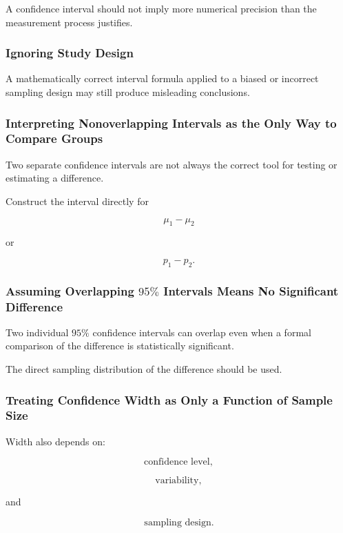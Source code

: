 A confidence interval should not imply more numerical precision than the
measurement process justifies.

\subsubsection{Ignoring Study Design}

A mathematically correct interval formula applied to a biased or
incorrect sampling design may still produce misleading conclusions.

\subsubsection{Interpreting Nonoverlapping Intervals as the Only Way to Compare Groups}

Two separate confidence intervals are not always the correct tool for
testing or estimating a difference.

Construct the interval directly for

\[
\mu_1-\mu_2
\]

or

\[
p_1-p_2.
\]

\subsubsection{Assuming Overlapping \(95\%\) Intervals Means No Significant Difference}

Two individual \(95\%\) confidence intervals can overlap even when a
formal comparison of the difference is statistically significant.

The direct sampling distribution of the difference should be used.

\subsubsection{Treating Confidence Width as Only a Function of Sample Size}

Width also depends on:

\[
\boxed{
\text{confidence level},
}
\]

\[
\boxed{
\text{variability},
}
\]

and

\[
\boxed{
\text{sampling design}.
}
\]

